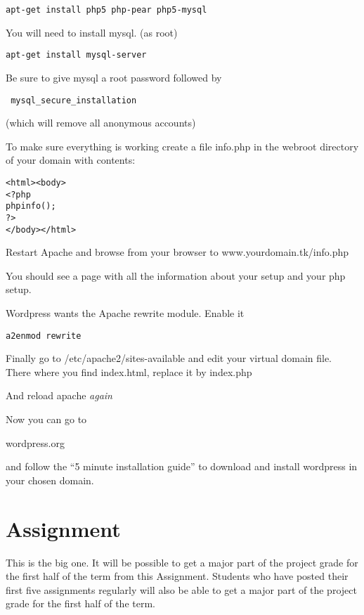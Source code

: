 \documentclass[12pt, a4paper]{article}
\begin{document}
\begin{verbatim}
apt-get install php5 php-pear php5-mysql
\end{verbatim}

You will need to install mysql. (as root)

\begin{verbatim}
apt-get install mysql-server
\end{verbatim}

Be sure to give mysql a root password
followed by

\begin{verbatim}
 mysql_secure_installation
\end{verbatim}

(which will remove all anonymous accounts)

To make sure everything is working create a file info.php in the webroot directory of your domain with contents:

\begin{verbatim}
<html><body>
<?php
phpinfo();
?>
</body></html>
\end{verbatim}

Restart Apache and browse from your browser to www.yourdomain.tk/info.php

You should see a page with all the information about your setup and your php setup.

Wordpress wants the Apache rewrite module. Enable it

\begin{verbatim}
a2enmod rewrite
\end{verbatim}


Finally go to /etc/apache2/sites-available and edit your virtual domain file. There where you find index.html, replace it by index.php

And reload apache \emph{again}

Now you can go to

wordpress.org

and follow the ``5 minute installation guide'' to download and install wordpress in your chosen domain.


\section*{Assignment}
This is the big one. It will be possible to get a major part of the project grade for the first half of the term from this Assignment. Students who have posted their first five assignments regularly will also be able to get a major part of the project grade for the first half of the term.
\end{document}
